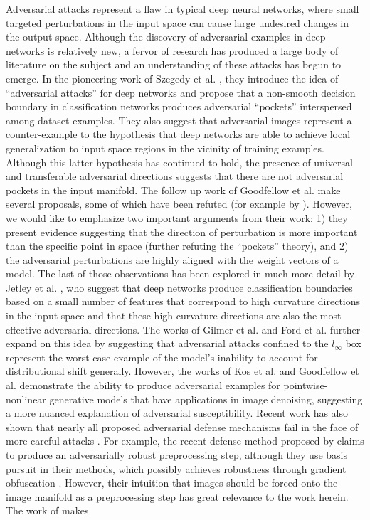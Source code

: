 Adversarial attacks represent a flaw in typical deep neural networks, where small targeted perturbations in the input space can cause large undesired changes in the output space. Although the discovery of adversarial examples in deep networks is relatively new, a fervor of research has produced a large body of literature on the subject and an understanding of these attacks has begun to emerge. In the pioneering work of Szegedy et al. \citeyearpar{szegedy2013intriguing}, they introduce the idea of ``adversarial attacks'' for deep networks and propose that a non-smooth decision boundary in classification networks produces adversarial ``pockets'' interspersed among dataset examples. They also suggest that adversarial images represent a counter-example to the hypothesis that deep networks are able to achieve local generalization to input space regions in the vicinity of training examples. Although this latter hypothesis has continued to hold, the presence of universal and transferable adversarial directions \parencite{moosavi2017universal} suggests that there are not adversarial pockets in the input manifold. The follow up work of Goodfellow et al. \citeyearpar{goodfellow2014explaining} make several proposals, some of which have been refuted (for example by \cite{jetley2018friends}). However, we would like to emphasize two important arguments from their work: 1) they present evidence suggesting that the direction of perturbation is more important than the specific point in space (further refuting the ``pockets'' theory), and 2) the adversarial perturbations are highly aligned with the weight vectors of a model. The last of those observations has been explored in much more detail by Jetley et al. \citeyearpar{jetley2018friends}, who suggest that deep networks produce classification boundaries based on a small number of features that correspond to high curvature directions in the input space and that these high curvature directions are also the most effective adversarial directions. The works of Gilmer et al. \citeyearpar{gilmer2018adversarial} and Ford et al. \citeyearpar{ford2019adversarial} further expand on this idea by suggesting that adversarial attacks confined to the $l_{\infty}$ box represent the worst-case example of the model's inability to account for distributional shift generally. However, the works of Kos et al. \citeyearpar{ford2019adversarial} and Goodfellow et al. \citeyearpar{goodfellow2014explaining} demonstrate the ability to produce adversarial examples for pointwise-nonlinear generative models that have applications in image denoising, suggesting a more nuanced explanation of adversarial susceptibility. Recent work has also shown that nearly all proposed adversarial defense mechanisms fail in the face of more careful attacks \parencite{carlini2017towards, athalye2018obfuscated}. For example, the recent defense method proposed by \parencite{sun2018adversarial} claims to produce an adversarially robust preprocessing step, although they use basis pursuit in their methods, which possibly achieves robustness through gradient obfuscation \parencite{athalye2018obfuscated}. However, their intuition that images should be forced onto the image manifold as a preprocessing step has great relevance to the work herein. The work of \parencite{jocobsen2018excessive} makes 
